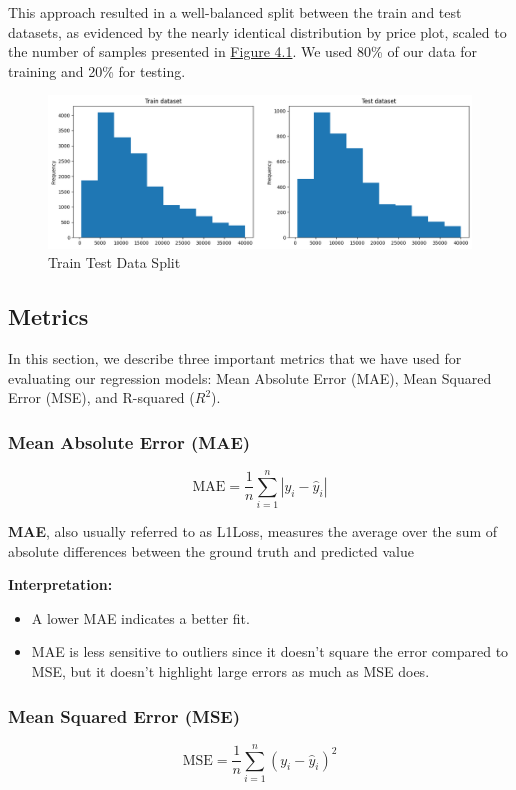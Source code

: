 This approach resulted in a well-balanced split between the train and test datasets, as evidenced by the nearly identical distribution by price plot, scaled to the number of samples presented in \hyperref[fig:data-split]{Figure 4.1}. We used 80\% of our data for training and 20\% for testing.

\begin{figure}[ht]
    \centering
    \includegraphics[width=\linewidth]{images/priceprediction/model/data_split.png}
    \caption{Train Test Data Split}
    \label{fig:data-split}
\end{figure}

\subsection{Metrics}

In this section, we describe three important metrics that we have used for evaluating our regression models: Mean Absolute Error (MAE), Mean Squared Error (MSE), and R-squared (\(R^2\)).

\subsubsection{Mean Absolute Error (MAE)}
\[ \text{MAE} = \frac{1}{n} \sum_{i=1}^{n} |y_i - \hat{y}_i| \]

\textbf{MAE}, also usually referred to as L1Loss, measures the average over the sum of absolute differences between the ground truth and predicted value

\textbf{Interpretation:}
\begin{itemize}
    \item A lower MAE indicates a better fit.
    \item MAE is less sensitive to outliers since it doesn't square the error compared to MSE, but it doesn't highlight large errors as much as MSE does.
\end{itemize}

\subsubsection{Mean Squared Error (MSE)}
\[ \text{MSE} = \frac{1}{n} \sum_{i=1}^{n} (y_i - \hat{y}_i)^2 \]

